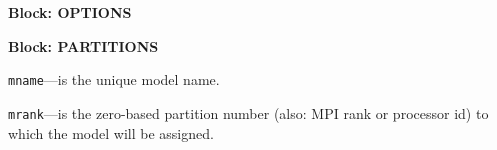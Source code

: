 
\item \textbf{Block: OPTIONS}

\begin{description}
\end{description}
\item \textbf{Block: PARTITIONS}

\begin{description}
\item \texttt{mname}---is the unique model name.

\item \texttt{mrank}---is the zero-based partition number (also: MPI rank or processor id) to which the model will be assigned.

\end{description}

